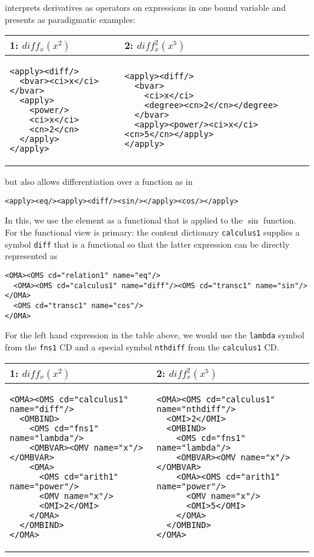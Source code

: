\documentclass{llncs}
\begin{document}
{\mathml} interprets derivatives as operators on expressions in one bound variable and
presents as paradigmatic examples:
\begin{center}\lstset{frame=none,numbers=none,lineskip=-.7ex,aboveskip=-.5em,belowskip=-1em,language=MathML2}
\begin{tabular}{|p{4.5cm}|p{8cm}|}\hline
  1: $diff_x(x^2)$ & 2: $diff^2_x(x^5)$\\\hline
\begin{lstlisting}
<apply><diff/>
  <bvar><ci>x</ci></bvar>
  <apply>
    <power/>
    <ci>x</ci>
    <cn>2</cn>
  </apply>
</apply>
\end{lstlisting}
&
\begin{lstlisting}[language=MathML2]
<apply><diff/>
  <bvar>
    <ci>x</ci>
    <degree><cn>2</cn></degree>
  </bvar>
  <apply><power/><ci>x</ci><cn>5</cn></apply>
</apply>
\end{lstlisting}
\\\hline
\end{tabular}
\end{center}
but also allows differentiation over a function as in 
\begin{lstlisting}[language=MathML2]
<apply><eq/><apply><diff/><sin/></apply><cos/></apply>
\end{lstlisting}
In this, we use the {} element as a functional that is applied to the $\sin$
function. For {\openmath} the functional view is primary: the content dictionary
{\texttt{calculus1}} supplies a symbol {\texttt{diff}} that is a functional so that the
latter expression can be directly represented as 
\begin{lstlisting}[language=OpenMath]
<OMA><OMS cd="relation1" name="eq"/>
  <OMA><OMS cd="calculus1" name="diff"/><OMS cd="transc1" name="sin"/></OMA>
  <OMS cd="transc1" name="cos"/>
</OMA>
\end{lstlisting}
For the left hand expression in the table above, we would use the {\texttt{lambda}} symbol
from the {\texttt{fns1}} CD and a special symbol {\texttt{nthdiff}} from the
{\texttt{calculus1}} CD.
\begin{center}\lstset{frame=none,numbers=none,lineskip=-.7ex,aboveskip=-.5em,belowskip=-1em,language=OpenMath}
\begin{tabular}{|p{6.8cm}|p{7.3cm}|}\hline
  1: $diff_x(x^2)$ & 2: $diff^2_x(x^5)$\\\hline
\begin{lstlisting}
<OMA><OMS cd="calculus1" name="diff"/>
  <OMBIND>
    <OMS cd="fns1" name="lambda"/>
    <OMBVAR><OMV name="x"/></OMBVAR>
    <OMA>
      <OMS cd="arith1" name="power"/>
      <OMV name="x"/>
      <OMI>2</OMI>
    </OMA>
  </OMBIND>
</OMA>
\end{lstlisting}
&
\begin{lstlisting}[language=OpenMath]
<OMA><OMS cd="calculus1" name="nthdiff"/>
  <OMI>2</OMI>
  <OMBIND>
    <OMS cd="fns1" name="lambda"/>
    <OMBVAR><OMV name="x"/></OMBVAR>
    <OMA><OMS cd="arith1" name="power"/>
      <OMV name="x"/>
      <OMI>5</OMI>
    </OMA>
  </OMBIND>
</OMA>
\end{lstlisting}
\\\hline
\end{tabular}
\end{center}
\end{document}
